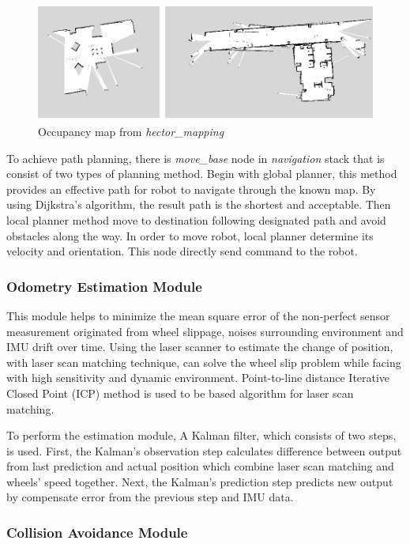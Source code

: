 \documentclass{llncs}
\begin{document}
\begin{figure}
\centering
\includegraphics[height=3.9cm]{hector_map}
\caption{Occupancy map from \textit{hector\_mapping}}
\label{fig:hector}
\end{figure}

To achieve path planning, there is \textit{move\_base} node in \textit{navigation} stack that is consist of two types of planning method. Begin with global planner, this method provides an effective path for robot to navigate through the known map. By using Dijkstra's algorithm, the result path is the shortest and acceptable. Then local planner method move to destination following designated path and avoid obstacles along the way. In order to move robot, local planner determine its velocity and orientation. This node directly send command to the robot.

\subsubsection{Odometry Estimation Module}

This module helps to minimize the mean square error of the non-perfect sensor measurement originated from wheel slippage, noises surrounding environment and IMU drift over time. Using the laser scanner to estimate the change of position, with laser scan matching technique, can solve the wheel slip problem while facing with high sensitivity and dynamic environment. Point-to-line distance Iterative Closed Point (ICP) method is used to be based algorithm for laser scan matching.

To perform the estimation module, A Kalman filter, which consists of two steps, is used. First, the Kalman's observation step calculates difference between output from last prediction and actual position which combine laser scan matching and wheels' speed together. Next, the Kalman's prediction step predicts new output by compensate error from the previous step and IMU data\cite{odom}.

\subsubsection{Collision Avoidance Module}
\end{document}
